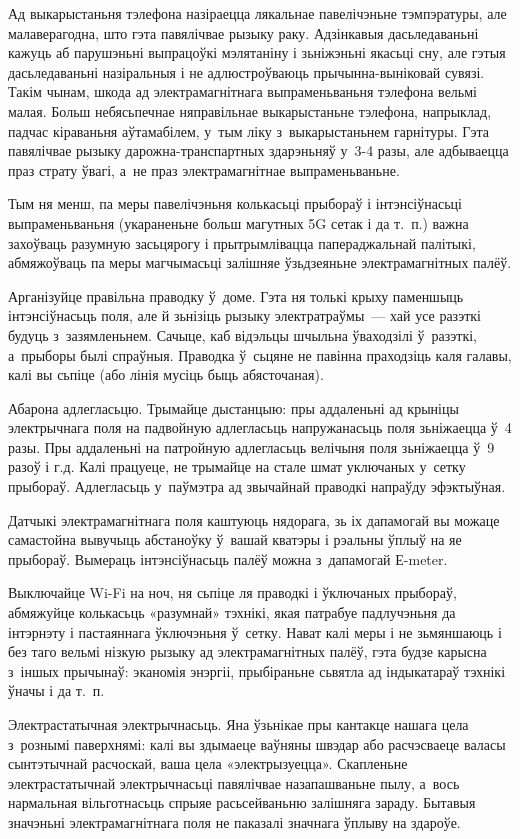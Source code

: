 Ад выкарыстаньня тэлефона назіраецца лякальнае павелічэньне тэмпэратуры, але малаверагодна, што гэта павялічвае рызыку раку. Адзінкавыя дасьледаваньні кажуць аб парушэньні выпрацоўкі мэлятаніну і зьніжэньні якасьці сну, але гэтыя дасьледаваньні назіральныя і не адлюстроўваюць прычынна-выніковай сувязі. Такім чынам, шкода ад электрамагнітнага выпраменьваньня тэлефона вельмі малая. Больш небясьпечнае няправільнае выкарыстаньне тэлефона, напрыклад, падчас кіраваньня аўтамабілем, у~тым ліку з~выкарыстаньнем гарнітуры. Гэта павялічвае рызыку дарожна-транспартных здарэньняў у~3-4 разы, але адбываецца праз страту ўвагі, а~не праз электрамагнітнае выпраменьваньне.

Тым ня менш, па меры павелічэньня колькасьці прыбораў і інтэнсіўнасьці выпраменьваньня (укараненьне больш магутных 5G сетак і да т.~п.) важна захоўваць разумную засьцярогу і прытрымлівацца папераджальнай палітыкі, абмяжоўваць па меры магчымасьці залішняе ўзьдзеяньне электрамагнітных палёў.

Арганізуйце правільна праводку ў~доме. Гэта ня толькі крыху паменшыць інтэнсіўнасьць поля, але й зьнізіць рызыку электратраўмы~--- хай усе разэткі будуць з~зазямленьнем. Сачыце, каб відэльцы шчыльна ўваходзілі ў~разэткі, а~прыборы былі спраўныя. Праводка ў~сьцяне не павінна праходзіць каля галавы, калі вы сьпіце (або лінія мусіць быць абясточаная).

Абарона адлегласьцю. Трымайце дыстанцыю: пры аддаленьні ад крыніцы электрычнага поля на падвойную адлегласьць напружанасьць поля зьніжаецца ў~4 разы. Пры аддаленьні на патройную адлегласьць велічыня поля зьніжаецца ў~9 разоў і г.д. Калі працуеце, не трымайце на стале шмат уключаных у~сетку прыбораў. Адлегласьць у~паўмэтра ад звычайнай праводкі напраўду эфэктыўная.

Датчыкі электрамагнітнага поля каштуюць нядорага, зь іх дапамогай вы можаце самастойна вывучыць абстаноўку ў~вашай кватэры і рэальны ўплыў на яе прыбораў. Вымераць інтэнсіўнасьць палёў можна з~дапамогай Е-meter.

Выключайце Wi-Fi на ноч, ня сьпіце ля праводкі і ўключаных прыбораў, абмяжуйце колькасьць «разумнай» тэхнікі, якая патрабуе падлучэньня да інтэрнэту і пастаяннага ўключэньня ў~сетку. Нават калі меры і не зьмяншаюць і без таго вельмі нізкую рызыку ад электрамагнітных палёў, гэта будзе карысна з~іншых прычынаў: эканомія энэргіі, прыбіраньне сьвятла ад індыкатараў тэхнікі ўначы і да т.~п.

Электрастатычная электрычнасьць. Яна ўзьнікае пры кантакце нашага цела з~рознымі паверхнямі: калі вы здымаеце ваўняны швэдар або расчэсваеце валасы сынтэтычнай расчоскай, ваша цела «электрызуецца». Скапленьне электрастатычнай электрычнасьці павялічвае назапашваньне пылу, а~вось нармальная вільготнасьць спрыяе расьсейваньню залішняга зараду. Бытавыя значэньні электрамагнітнага поля не паказалі значнага ўплыву на здароўе.

